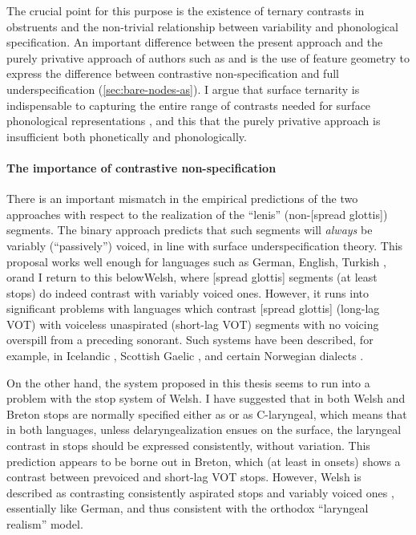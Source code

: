 The crucial point for this purpose is the existence of ternary contrasts in obstruents and the non\hyp trivial relationship between variability and phonological specification. An important difference between the present approach and the purely privative approach of authors such as \citet{iverson95} and \citet{honeybone05} is the use of feature geometry to express the difference between contrastive non\hyp specification and full underspecification (\cref{sec:bare-nodes-as}). I argue that surface ternarity is indispensable to capturing the entire range of contrasts needed for surface phonological representations \citep[\cf also][]{kim02:_phonol,strycharczuk12:_phonet}, and this that the purely privative approach is insufficient both phonetically and phonologically.

\paragraph{The importance of contrastive non-specification}
\label{sec:import-contr-non}

There is an important mismatch in the empirical predictions of the two approaches with respect to the realization of the \enquote{lenis} (\ie non\hyp[spread glottis]) segments. The binary approach predicts that such segments will \emph{always} be variably (\enquote{passively}) voiced, in line with surface underspecification theory. This proposal works well enough for languages such as German, English,
Turkish \citep{kallestinova04:_voice_turkis}, or\dash and I return to this below\dash Welsh, where [spread glottis] segments (at least stops) do indeed contrast with variably voiced ones. However, it runs into significant problems with languages which contrast [spread glottis] (long\hyp lag VOT) with voiceless unaspirated (short\hyp lag VOT) segments with no voicing overspill from a preceding sonorant. Such systems have been described, for example, in Icelandic \citep{lofqvist81:_laryn_activ_icelan_obstr_produc}, Scottish Gaelic \citep{ladefogedetal-scg}, and certain Norwegian dialects \citep{oftedal47:_jaers}.

On the other hand, the system proposed in this thesis seems to run into a problem with the stop system of Welsh. I have suggested that in both Welsh and Breton stops are normally specified either as  or as C-laryngeal, which means that in both languages, unless delaryngealization ensues on the surface, the laryngeal contrast in stops should be expressed consistently, without variation. This prediction appears to be borne out in Breton, which (at least in onsets) shows a contrast between prevoiced and short-lag VOT stops. However, Welsh is described as contrasting consistently aspirated stops and variably voiced ones \citep[\egm][]{ball-phon,brycheiniog,ball01:_welsh_phonet}, essentially like German, and thus consistent with the orthodox \enquote{laryngeal realism} model.

